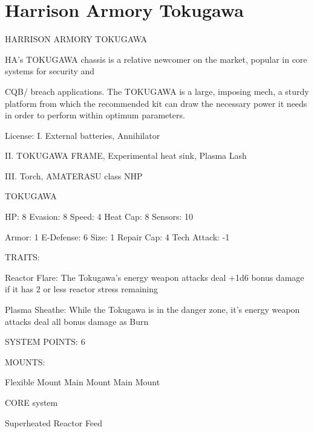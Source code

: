 \section{Harrison Armory Tokugawa}

                             HARRISON ARMORY TOKUGAWA  

HA’s TOKUGAWA chassis is a relative newcomer on the market, popular in core systems for security and  

CQB/ breach applications. The TOKUGAWA is a large, imposing mech, a sturdy platform from which the  
recommended kit can draw the necessary power it needs in order to perform within optimum parameters.   

                                                  License:  
I. External batteries, Annihilator
 
II. TOKUGAWA FRAME, Experimental heat sink, Plasma Lash
 
III. Torch, AMATERASU class NHP
 

                                                                                                          


                                                    TOKUGAWA 

  HP: 8            Evasion: 8                              Speed: 4             Heat Cap: 8         Sensors: 10 

  Armor: 1         E-Defense: 6                            Size: 1              Repair Cap: 4       Tech Attack: -1 

                                                        TRAITS: 

  Reactor Flare: The Tokugawa’s energy weapon attacks deal +1d6 bonus damage if it has 2 or less  
  reactor stress remaining
 
  Plasma Sheathe: While the Tokugawa is in the danger zone, it’s energy weapon attacks deal all bonus  
  damage as Burn 

                                                 SYSTEM POINTS: 6 

                                                       MOUNTS: 

  Flexible Mount                       Main Mount                               Main Mount 

                                                    CORE system 

                                             Superheated Reactor Feed  

